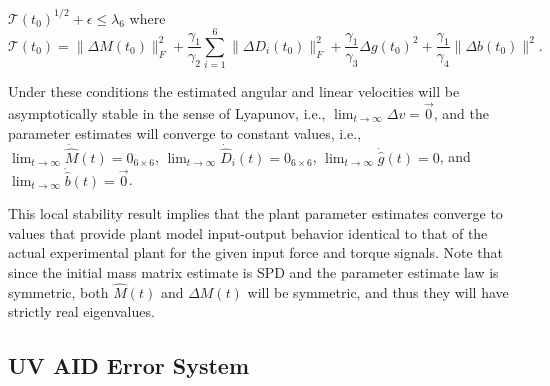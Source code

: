 \begin{UV_SE3_AID}
\begin{itemize}
$\mathcal{T}(t_0)^{1/2}+\epsilon\leq \lambda_6$ where
\begin{equation} 
  \mathcal{T}(t_0)=\|\Delta M(t_0)\|_F^2 +
                    \frac{\gamma_1}{\gamma_2}\sum_{i=1}^6 \|\Delta D_i(t_0)\|_F^2 + 
                    \frac{\gamma_1}{\gamma_3}\Delta g(t_0)^2
                     + \frac{\gamma_1}{\gamma_4}\|\Delta b(t_0)\|^2.
\end{equation}
\end{itemize}
%
\noindent Under these conditions the estimated angular and linear
velocities will be asymptotically stable in the sense of Lyapunov,
i.e., $\lim_{t\to \infty}\Delta v=\vec{0}$, and the parameter
estimates will converge to constant values, i.e., $\lim_{t\to
  \infty}\dot{\hat{M}}(t)=0_{6\times 6}$, $\lim_{t\to
  \infty}\dot{\hat{D}}_i(t)=0_{6\times 6}$, $\lim_{t\to
  \infty}\dot{\hat{g}}(t)=0$, and $\lim_{t\to
  \infty}\dot{\hat{b}}(t)=\vec{0}$. 
\end{UV_SE3_AID}

This local stability result implies that the plant parameter estimates
converge to values that provide plant model input-output behavior
identical to that of the actual experimental plant for the given input
force and torque signals.  Note that since the initial mass matrix
estimate is \ac{SPD} and the parameter estimate law is symmetric, both
$\hat{M}(t)$ and $\Delta M(t)$ will be symmetric, and thus they will
have strictly real eigenvalues.

\subsection{\ac{UV} \ac{AID} Error System}\label{chUV_AID.sec.UV_SE3_error}
\label{chUV_AID.sec.UVSE3_AID_errSys}


%

